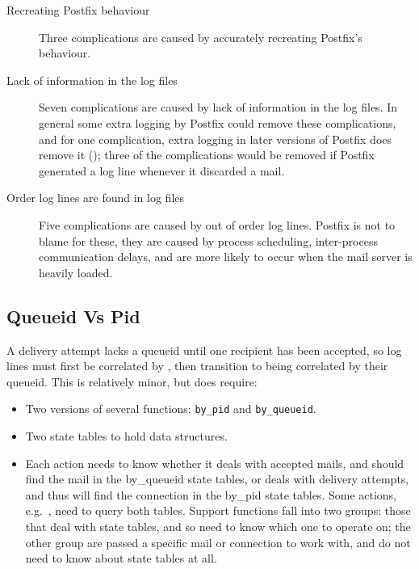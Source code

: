 \begin{description}

    \item [Recreating Postfix behaviour] Three complications are caused by
        \parsername{} accurately recreating Postfix's behaviour.

    \item [Lack of information in the log files] Seven complications are
        caused by lack of information in the log files.  In general some
        extra logging by Postfix could remove these complications, and for
        one complication, extra logging in later versions of Postfix does
        remove it (); three of
        the complications would be removed if Postfix generated a log line
        whenever it discarded a mail.

    \item [Order log lines are found in log files] Five complications are
        caused by out of order log lines.  Postfix is not to blame for
        these, they are caused by process scheduling, inter-process
        communication delays, and are more likely to occur when the mail
        server is heavily loaded.

\end{description}

\subsection{Queueid Vs Pid}

\label{queueid vs pid}

A delivery attempt lacks a queueid until one recipient has been accepted,
so log lines must first be correlated by  , then
transition to being correlated by their queueid.  This is relatively minor,
but does require:

\begin{itemize}

    \item Two versions of several functions: \texttt{by\_pid} and
        \texttt{by\_queueid}.

    \item Two state tables to hold data structures.

    \item Each action needs to know whether it deals with accepted mails,
        and should find the mail in the by\_queueid state tables, or deals
        with delivery attempts, and thus will find the connection in the
        by\_pid state tables.  Some actions, e.g.\
        , need to query both tables.  Support
        functions fall into two groups: those that deal with state tables,
        and so need to know which one to operate on; the other group are
        passed a specific mail or connection to work with, and do not need
        to know about state tables at all.

\end{itemize}

